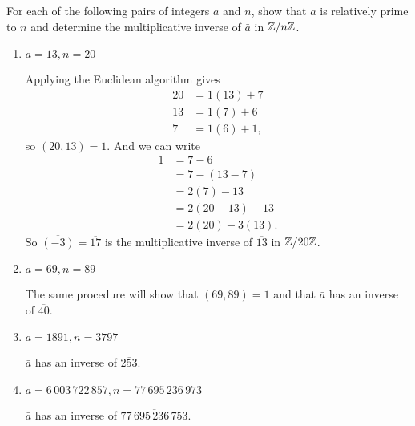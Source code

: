  For each of the following pairs of integers $a$ and $n$,
show that $a$ is relatively prime to $n$ and determine the
multiplicative inverse of $\bar{a}$ in $\mathbb{Z}/n\mathbb{Z}$.
\begin{enumerate}
\item
  $a = 13, n = 20$
  \begin{solution}
    Applying the Euclidean algorithm gives
    \begin{align*}
      20 &= 1(13) + 7 \\
      13 &= 1(7) + 6 \\
      7 &= 1(6) + 1,
    \end{align*}
    so $(20, 13) = 1$. And we can write
    \begin{align*}
      1 &= 7 - 6 \\
        &= 7 - (13 - 7) \\
        &= 2(7) - 13 \\
        &= 2(20 - 13) - 13 \\
        &= 2(20) - 3(13).
    \end{align*}
    So $\overline{(-3)} = \overline{17}$ is the multiplicative inverse
    of $\overline{13}$ in $\mathbb{Z}/20\mathbb{Z}$.
  \end{solution}

\item
  $a = 69, n = 89$
  \begin{solution}
    The same procedure will show that $(69,89) = 1$ and that $\bar{a}$
    has an inverse of $\overline{40}$.
  \end{solution}

\item
  $a = 1891, n = 3797$
  \begin{solution}
    $\bar{a}$ has an inverse of $\overline{253}$.
  \end{solution}

\item
  $a = 6\,003\,722\,857, n = 77\,695\,236\,973$
  \begin{solution}
    $\bar{a}$ has an inverse of $\overline{77\,695\,236\,753}$.
  \end{solution}
\end{enumerate}
